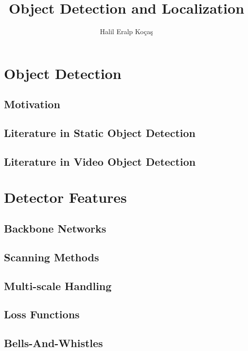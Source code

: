 \documentclass[12pt, letterpaper, twoside]{article}
\title{Object Detection and Localization}
\author{Halil Eralp Koçaş}
\begin{document}
\begin{titlepage}
\maketitle
\end{titlepage}


\section{Object Detection}

\vfill

\subsection{Motivation}

\vfill

\subsection{Literature in Static Object Detection}

\vfill

\subsection{Literature in Video Object Detection}

\vfill

\section{Detector Features}

\vfill

\subsection{Backbone Networks}

\vfill

\subsection{Scanning Methods}
\subsection{Multi-scale Handling}
\subsection{Loss Functions}
\subsection{Bells-And-Whistles}
\end{document}
